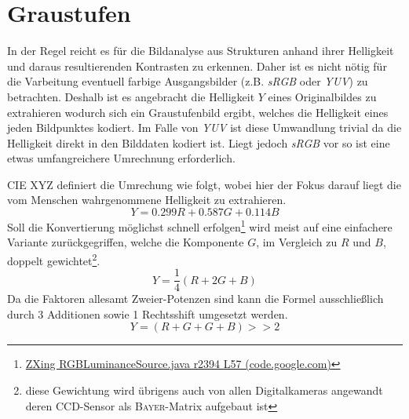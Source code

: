 \section*{Graustufen}
\writtenby{\dcauthornameewie}%
In der Regel reicht es für die Bildanalyse aus Strukturen anhand ihrer Helligkeit und daraus resultierenden Kontrasten zu erkennen.
Daher ist es nicht nötig für die Varbeitung eventuell farbige Ausgangsbilder (z.B. \textit{sRGB} oder \textit{YUV}) zu betrachten.
Deshalb ist es angebracht die Helligkeit $Y$ eines Originalbildes zu extrahieren wodurch sich ein Graustufenbild ergibt, welches die Helligkeit eines jeden Bildpunktes kodiert.
Im Falle von \textit{YUV} ist diese Umwandlung trivial da die Helligkeit direkt in den Bilddaten kodiert ist.
Liegt jedoch \textit{sRGB} vor so ist eine etwas umfangreichere Umrechnung erforderlich.

CIE XYZ definiert die Umrechung wie folgt, wobei hier der Fokus darauf liegt die vom Menschen wahrgenommene Helligkeit zu extrahieren.
  \[ Y = 0.299 R + 0.587 G + 0.114 B \]
Soll die Konvertierung möglichst schnell erfolgen\footnote{\href{https://code.google.com/p/zxing/source/browse/trunk/core/src/com/google/zxing/RGBLuminanceSource.java?spec=svn2633&r=2394\#57}{ZXing RGBLuminanceSource.java r2394 L57 (code.google.com)}} wird meist auf eine einfachere Variante zurückgegriffen, welche die Komponente $G$, im Vergleich zu $R$ und $B$, doppelt gewichtet\footnote{diese Gewichtung wird übrigens auch von allen Digitalkameras angewandt deren CCD-Sensor als \textsc{Bayer}-Matrix aufgebaut ist}.
  \[ Y = \frac{1}{4}(R + 2 G + B) \]
Da die Faktoren allesamt Zweier-Potenzen sind kann die Formel ausschließlich durch 3 Additionen sowie 1 Rechtsshift umgesetzt werden.
  \[ Y = (R + G + G + B) >> 2 \]
